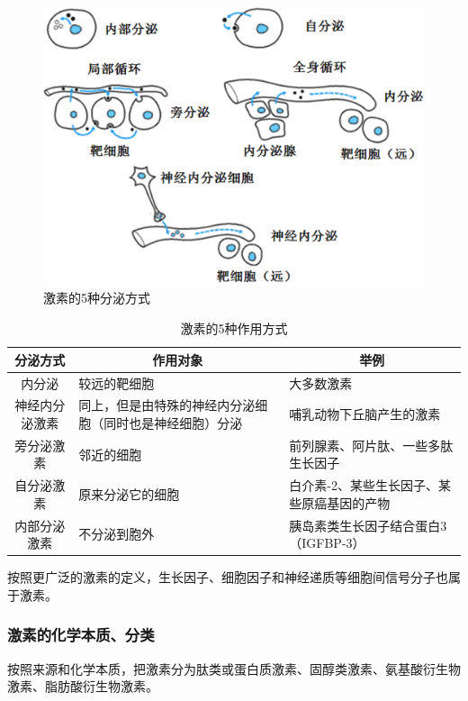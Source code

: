 \begin{figure}[htbp]
	\centering
	\includegraphics[width=0.7\linewidth]{Pics/激素作用类型}
	\caption{激素的5种分泌方式}
	\label{fig:hormone_types}
\end{figure}

\begin{table}[htbp]
	\centering
	\begin{tabularx}{\textwidth}{|c|X|X|}
		\hline
		\multicolumn{1}{|c|}{分泌方式} & \multicolumn{1}{c|}{作用对象} & \multicolumn{1}{c|}{举例} \\ \hline
		内分泌 & 较远的靶细胞 & 大多数激素 \\ \hline
		神经内分泌激素 & 同上，但是由特殊的神经内分泌细胞（同时也是神经细胞）分泌 & 哺乳动物下丘脑产生的激素 \\ \hline
		旁分泌激素 & 邻近的细胞 & 前列腺素、阿片肽、一些多肽生长因子 \\ \hline
		自分泌激素 & 原来分泌它的细胞 & 白介素-2、某些生长因子、某些原癌基因的产物 \\ \hline
		内部分泌激素 & 不分泌到胞外 & 胰岛素类生长因子结合蛋白3（IGFBP-3） \\ \hline
	\end{tabularx}
	\caption{激素的5种作用方式}
	\label{tab:hormone_types}
\end{table}

按照更广泛的激素的定义，生长因子、细胞因子和神经递质等细胞间信号分子也属于激素。

\subsubsection{激素的化学本质、分类}

按照来源和化学本质，把激素分为肽类或蛋白质激素、固醇类激素、氨基酸衍生物激素、脂肪酸衍生物激素。

